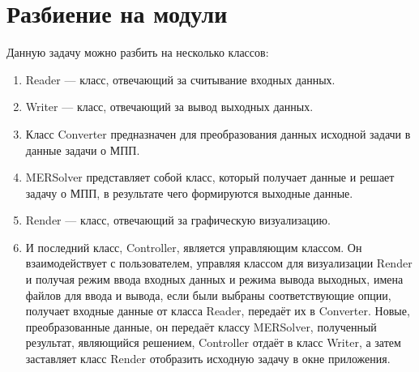 \documentclass[a4paper,12pt]{article}
\begin{document}
{\newpage

\section{Разбиение на модули} {
Данную задачу можно разбить на несколько классов:
\begin{enumerate}
\item Reader — класс, отвечающий за считывание входных данных. 
\item Writer — класс, отвечающий за вывод выходных данных.
\item Класс Converter предназначен для преобразования данных исходной задачи в данные задачи о МПП. 
\item MERSolver представляет собой класс, который получает данные и решает задачу о МПП, в результате чего формируются выходные данные.
\item Render — класс, отвечающий за графическую визуализацию.
\item И последний класс, Controller, является управляющим классом. Он взаимодействует с пользователем, управляя классом для визуализации Render и получая режим ввода входных данных и режима вывода выходных, имена файлов для ввода и вывода, если были выбраны соответствующие опции, получает входные данные от класса Reader, передаёт их в Converter. Новые, преобразованные данные, он передаёт классу MERSolver, полученный результат, являющийся решением, Controller отдаёт в класс Writer, а затем заставляет класс Render отобразить исходную задачу в окне приложения.
\end{enumerate}

\newpage

}}
\end{document}
